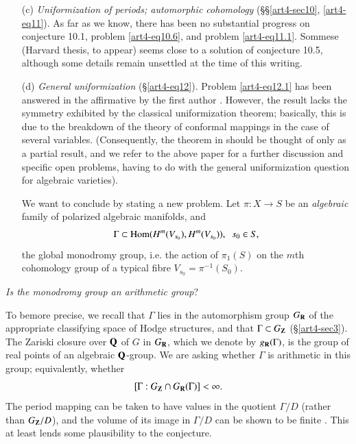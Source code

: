 \begin{itemize}
\item[(c)] \textit{Uniformization of periods; automorphic cohomology } (\S\S \ref{art4-sec10}, \ref{art4-eq11}). As far as we know, there has been no substantial progress on conjecture 10.1, problem \eqref{art4-eq10.6}, and problem \eqref{art4-eq11.1}. Sommese (Harvard thesis, to appear) seems close to a solution of conjecture 10.5, although some details remain unsettled at the time of this writing.

\item[(d)] \textit{General uniformization} (\S\ref{art4-eq12}). Problem \ref{art4-eq12.1} has been answered in the affirmative by the first author \cite{art4-key23}. However, the result lacks the symmetry exhibited by the classical uniformization theorem; basically, this is due to the breakdown of the theory of conformal mappings in the case of several variables. (Consequently, the theorem in \cite{art4-key23} should be thought of only as a partial result, and we refer to the above paper for a further discussion and specific open problems, having to do with the general uniformization question for algebraic varieties).

We want to conclude by stating a new problem. Let $\pi : X \to S$ be an \textit{algebraic} family of polarized algebraic manifolds, and 
$$
\Gamma \subset \operatorname{Hom} (H^m (V_{s_0}), H^m (V_{s_0})), \;\; s_0 \in S,
$$
the global monodromy group, i.e. the action of $\pi_1 (S)$ on the $m$th cohomology group of a typical fibre $V_{s_0} = \pi^{-1}(S_0)$.
\end{itemize}

\begin{problem}
\textit{Is the monodromy group an arithmetic group}?

To be\pageoriginale more precise, we recall that $\Gamma$ lies in the automorphism group $G_{\mathbf{R}}$ of the appropriate classifying space of Hodge structures, and that $\Gamma \subset G_{\mathbf{Z}}$ (\cf \S \ref{art4-sec3}). The  Zariski closure over $\mathbf{Q}$ of $G$ in $G_{\mathbf{R}}$, which we denote by $g_{\mathbf{R}} (\Gamma)$, is the group of real points of an algebraic $\mathbf{Q}$-group. We are asking whether $\Gamma$ is arithmetic in this group; equivalently, whether
$$
[\Gamma : G_{\mathbf{Z}} \cap G_{\mathbf{R}} (\Gamma)] < \infty.
$$
The period mapping can be taken to have values in the quotient $\Gamma / D$ (rather than $G_{\mathbf{Z}} / D$), and the volume of its image in $\Gamma / D$ can be shown to be finite \cite{art4-key19}. This at least lends some plausibility to the conjecture.
\end{problem}

